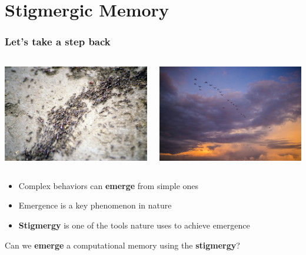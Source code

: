 \documentclass{beamer}
\begin{document}
\section{Stigmergic Memory}
\begin{frame}
    \frametitle{Let's take a step back}
    \pause
    \begin{columns}
        \begin{column}{0.5\textwidth}
            \includegraphics[width=\textwidth]{img/ants.jpg}
        \end{column}
        \pause
        \begin{column}{0.5\textwidth}
            \includegraphics[width=\textwidth]{img/birds.jpg}
        \end{column}
        \pause
    \end{columns}
    \vspace{0.5cm}
    \begin{itemize}
        \item Complex behaviors can \textbf{emerge} from simple ones
        \item Emergence is a key phenomenon in nature
        \item \textbf{Stigmergy} is one of the tools nature uses to achieve emergence
    \end{itemize}
    \vspace{0.3cm}
    \pause
    \begin{center}
        Can we \textbf{emerge} a computational memory using the \textbf{stigmergy}?
    \end{center}
\end{frame}
\end{document}
